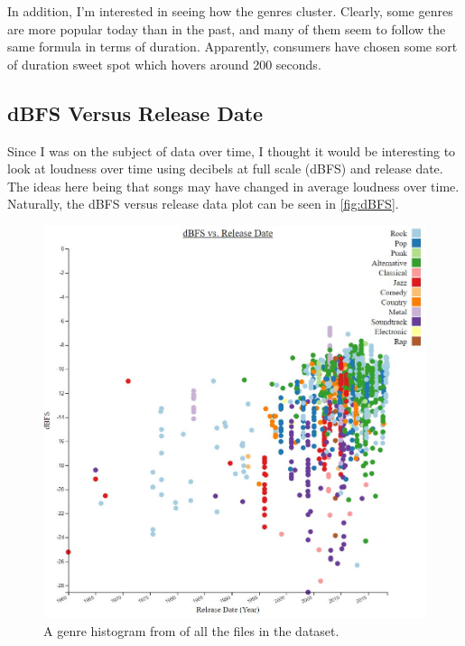 \documentclass[journal]{vgtc}                %
\begin{document}
In addition, I'm interested in seeing how the genres cluster. Clearly, some
genres are more popular today than in the past, and many of them seem to
follow the same formula in terms of duration. Apparently, consumers have
chosen some sort of duration sweet spot which hovers around 200 seconds.

\subsection{dBFS Versus Release Date}

Since I was on the subject of data over time, I thought it would be interesting
to look at loudness over time using decibels at full scale (dBFS) and release
date. The ideas here being that songs may have changed in average loudness over
time. Naturally, the dBFS versus release data plot can be seen in
\autoref{fig:dBFS}.

\begin{figure}[h]
 \centering %
 \includegraphics[width=\columnwidth]{dbfs-vs-release-date}
 \caption{A genre histogram from \cite{Grifski:2019} of all the files in the dataset.}
 \label{fig:dBFS}
\end{figure}
\end{document}
